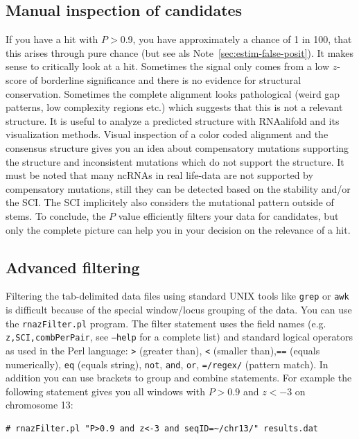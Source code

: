 \documentclass[11pt]{article}
\begin{document}
\subsection{Manual inspection of candidates}
\label{sec:filt-sign-hits}

If you have a hit with $P>$0.9, you have approximately a chance of 1 in
100, that this arises through pure chance (but see als
Note~\ref{sec:estim-false-posit}). It makes sense to critically look at a
hit. Sometimes the signal only comes from a low $z$-score of borderline
significance and there is no evidence for structural conservation.
Sometimes the complete alignment looks pathological (weird gap patterns,
low complexity regions etc.) which suggests that this is not a relevant
structure. It is useful to analyze a predicted structure with RNAalifold
and its visualization methods. Visual inspection of a color coded alignment
and the consensus structure gives you an idea about compensatory mutations
supporting the structure and inconsistent mutations which do not support
the structure. It must be noted that many ncRNAs in real life-data are not
supported by compensatory mutations, still they can be detected based on
the stability and/or the SCI. The SCI implicitely also considers the
mutational pattern outside of stems. To conclude, the $P$ value efficiently
filters your data for candidates, but only the complete picture can help
you in your decision on the relevance of a hit.

\subsection{Advanced filtering}
\label{sec:formulating-filter}

Filtering the tab-delimited data files using standard UNIX tools like
\texttt{grep} or \texttt{awk} is difficult because of the special
window/locus grouping of the data. You can use the \texttt{rnazFilter.pl}
program. The filter statement uses the field names (e.g.
\texttt{z,SCI,combPerPair}, see \texttt{--help} for a complete list) and
standard logical operators as used in the Perl language: \texttt{>}
(greater than), \texttt{<} (smaller than),\texttt{==} (equals numerically),
\texttt{eq} (equals string), \texttt{not}, \texttt{and}, \texttt{or},
\texttt{=\raisebox{-0.7ex}{\~{ }}/regex/} (pattern match).  In addition you
can use brackets to group and combine statements. For example the following
statement gives you all windows with $P>0.9$ and $z<-3$ on chromosome 13:

\begin{verbatim}
# rnazFilter.pl "P>0.9 and z<-3 and seqID=~/chr13/" results.dat
\end{verbatim}
\end{document}

